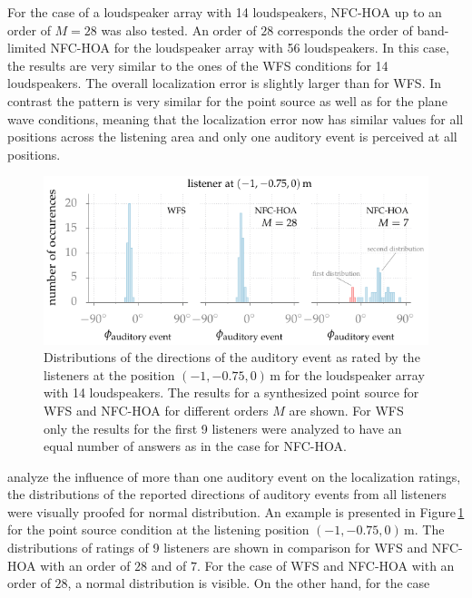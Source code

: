 For the case of a loudspeaker array with 14 loudspeakers, \ac{NFC-HOA}
up to an order of $M = 28$ was also tested. An order of $28$
corresponds the order of band-limited
\ac{NFC-HOA} for the loudspeaker array with 56 loudspeakers. 
In this case, the results are very similar to the ones of the \ac{WFS} conditions
for 14 loudspeakers. The overall localization error is slightly larger than for
\ac{WFS}. In contrast the pattern is very similar for the point source as well as for the
plane wave conditions, meaning that the localization error now has similar
values for all positions across the listening area
and only one auditory event is perceived at all
positions.

\begin{figure}
    \centering
    \includegraphics{fig5_05/fig5_05}
    \caption{Distributions of the directions of the auditory event as rated by
    the listeners at the position $(-1,-0.75,0)$\,m for the loudspeaker array with
    14 loudspeakers. The results for a synthesized point source for \ac{WFS} and
    \ac{NFC-HOA} for different orders $M$ are shown. For \ac{WFS} only the
    results for the first 9 listeners were analyzed to have an equal number of
    answers as in the case for \ac{NFC-HOA}.
    }
    \label{fig:localization_distribution}
\end{figure}
%
 analyze the influence of more than one auditory event on the
localization ratings, the distributions of the reported directions of auditory
events from all listeners were visually proofed for normal distribution. An
example is presented in Figure\,\ref{fig:localization_distribution} for the point
source condition at the listening position $(-1,-0.75,0)$\,m. The distributions
of ratings of 9 listeners are shown in comparison for \ac{WFS} and \ac{NFC-HOA}
with an order of $28$ and of $7$. For the case of \ac{WFS} and \ac{NFC-HOA} with an
order of $28$, a normal distribution is visible. On the other hand, for the case
